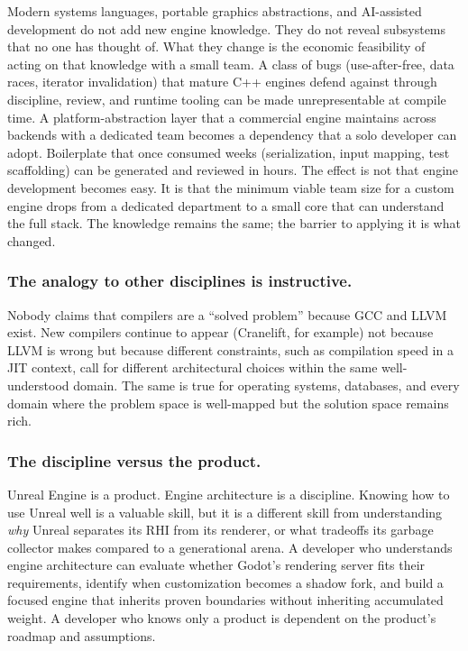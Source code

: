 \documentclass[
  11pt,
  letterpaper,
  DIV=11,
  numbers=noendperiod,
  twoside,
  open=right]{scrreprt}
\begin{document}
Modern systems languages, portable graphics abstractions, and
AI-assisted development do not add new engine knowledge. They do not
reveal subsystems that no one has thought of. What they change is the
economic feasibility of acting on that knowledge with a small team. A
class of bugs (use-after-free, data races, iterator invalidation) that
mature C++ engines defend against through discipline, review, and
runtime tooling can be made unrepresentable at compile time. A
platform-abstraction layer that a commercial engine maintains across
backends with a dedicated team becomes a dependency that a solo
developer can adopt. Boilerplate that once consumed weeks
(serialization, input mapping, test scaffolding) can be generated and
reviewed in hours. The effect is not that engine development becomes
easy. It is that the minimum viable team size for a custom engine drops
from a dedicated department to a small core that can understand the full
stack. The knowledge remains the same; the barrier to applying it is
what changed.

\subsubsection*{The analogy to other disciplines is
instructive.}\label{the-analogy-to-other-disciplines-is-instructive.}

Nobody claims that compilers are a ``solved problem'' because GCC and
LLVM exist. New compilers continue to appear (Cranelift, for example)
not because LLVM is wrong but because different constraints, such as
compilation speed in a JIT context, call for different architectural
choices within the same well-understood domain. The same is true for
operating systems, databases, and every domain where the problem space
is well-mapped but the solution space remains rich.

\subsubsection*{The discipline versus the
product.}\label{the-discipline-versus-the-product.}

Unreal Engine is a product. Engine architecture is a discipline. Knowing
how to use Unreal well is a valuable skill, but it is a different skill
from understanding \emph{why} Unreal separates its RHI from its
renderer, or what tradeoffs its garbage collector makes compared to a
generational arena. A developer who understands engine architecture can
evaluate whether Godot's rendering server fits their requirements,
identify when customization becomes a shadow fork, and build a focused
engine that inherits proven boundaries without inheriting accumulated
weight. A developer who knows only a product is dependent on the
product's roadmap and assumptions.
\end{document}
